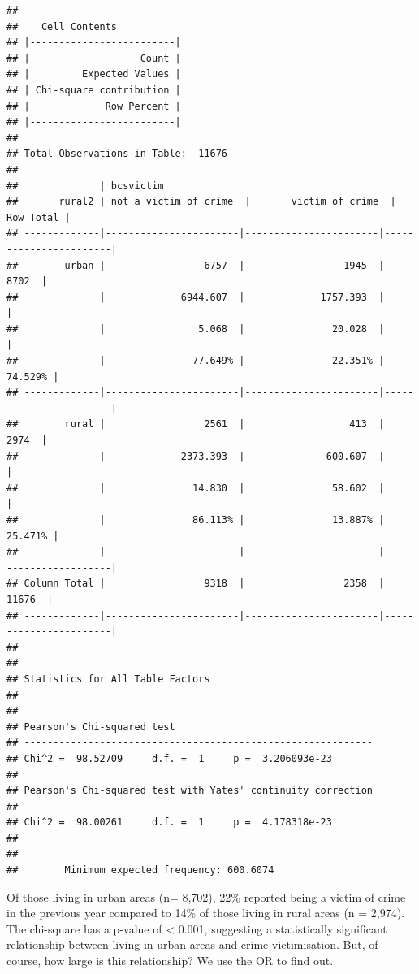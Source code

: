 \documentclass[
]{book}
\begin{document}
\begin{verbatim}
## 
##    Cell Contents
## |-------------------------|
## |                   Count |
## |         Expected Values |
## | Chi-square contribution |
## |             Row Percent |
## |-------------------------|
## 
## Total Observations in Table:  11676 
## 
##              | bcsvictim 
##       rural2 | not a victim of crime  |       victim of crime  |             Row Total | 
## -------------|-----------------------|-----------------------|-----------------------|
##        urban |                 6757  |                 1945  |                 8702  | 
##              |             6944.607  |             1757.393  |                       | 
##              |                5.068  |               20.028  |                       | 
##              |               77.649% |               22.351% |               74.529% | 
## -------------|-----------------------|-----------------------|-----------------------|
##        rural |                 2561  |                  413  |                 2974  | 
##              |             2373.393  |              600.607  |                       | 
##              |               14.830  |               58.602  |                       | 
##              |               86.113% |               13.887% |               25.471% | 
## -------------|-----------------------|-----------------------|-----------------------|
## Column Total |                 9318  |                 2358  |                11676  | 
## -------------|-----------------------|-----------------------|-----------------------|
## 
##  
## Statistics for All Table Factors
## 
## 
## Pearson's Chi-squared test 
## ------------------------------------------------------------
## Chi^2 =  98.52709     d.f. =  1     p =  3.206093e-23 
## 
## Pearson's Chi-squared test with Yates' continuity correction 
## ------------------------------------------------------------
## Chi^2 =  98.00261     d.f. =  1     p =  4.178318e-23 
## 
##  
##        Minimum expected frequency: 600.6074
\end{verbatim}

Of those living in urban areas (n= 8,702), 22\% reported being a victim of crime in the previous year compared to 14\% of those living in rural areas (n = 2,974). The chi-square has a p-value of \textless{} 0.001, suggesting a statistically significant relationship between living in urban areas and crime victimisation. But, of course, how large is this relationship? We use the OR to find out.
\end{document}
